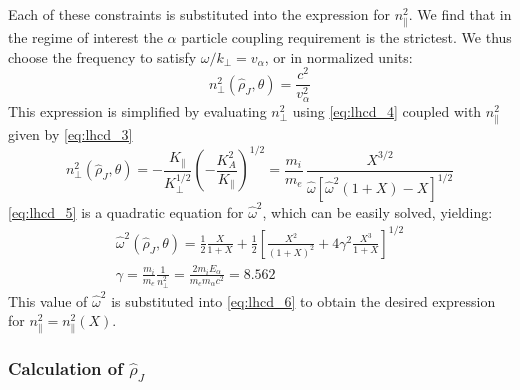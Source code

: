 Each of these constraints is substituted into the expression for $n_\parallel^2$. We find that in the regime of interest the $\alpha$ particle coupling requirement is the strictest. We thus choose the frequency to satisfy $\omega / k _ { \perp } = v _ { \alpha }$, or in normalized units:
\begin{equation}
	n _ { \perp } ^ { 2 } \left( \hat { \rho } _ { J } , \theta \right) = \frac { c ^ { 2 } } { v _ { \alpha } ^ { 2 } }
\end{equation}
This expression is simplified by evaluating $n_\perp^2$ using \cref{eq:lhcd_4} coupled with $n_\parallel^2$ given by \cref{eq:lhcd_3}
\begin{equation}
	n _ { \perp } ^ { 2 } \left( \hat { \rho } _ { J } , \theta \right) = - \frac { K _ { \| } } { K _ { \perp } ^ { 1 / 2 } } \left( - \frac { K _ { A } ^ { 2 } } { K _ { \| } } \right) ^ { 1 / 2 } = \frac { m _ { i } } { m _ { e } } \, \frac { X ^ { 3 / 2 } } { \hat { \omega } \left[ \hat { \omega } ^ { 2 } ( 1 + X ) - X \right] ^ { 1 / 2 } }
	\label{eq:lhcd_5}
\end{equation}
\cref{eq:lhcd_5} is a quadratic equation for $\hat \omega ^2$, which can be easily solved, yielding:
\begin{gather} 
	\hat { \omega } ^ { 2 } \left( \hat { \rho } _ { J } , \theta \right) = \frac { 1 } { 2 } \frac { X } { 1 + X } + \frac { 1 } { 2 } \left[ \frac { X ^ { 2 } } { ( 1 + X ) ^ { 2 } } + 4 \gamma ^ { 2 } \frac { X ^ { 3 } } { 1 + X } \right] ^ { 1 / 2 }  \\
	 \gamma = \frac { m _ { i } } { m _ { e } } \frac { 1 } { n _ { \perp } ^ { 2 } } = \frac { 2 m _ { i } E _ { \alpha } } { m _ { e } m _ { \alpha } c ^ { 2 } } = 8.562 
\end{gather}
This value of $\hat \omega ^2$ is substituted into \cref{eq:lhcd_6} to obtain the desired expression for $n _ { \| } ^ { 2 } = n _ { \| } ^ { 2 } ( X )$.

\subsubsection{Calculation of $\hat \rho_J$}

